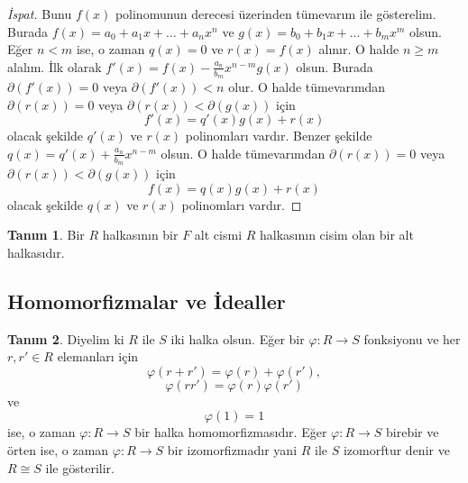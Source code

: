 \documentclass{article}
\theoremstyle{definition}
\newtheorem{defn}{Tanım}[section]
\theoremstyle{remark}
\begin{document}
    		\begin{proof}[İspat]
    		    Bunu $f(x)$ polinomunun derecesi üzerinden tümevarım ile gösterelim. Burada $f(x) = a_0 + a_1x + \dots + a_nx^n$ ve $g(x) = b_0 + b_1x + \dots + b_mx^m$ olsun. Eğer $n < m$ ise, o zaman $q(x) = 0$ ve $r(x) = f(x)$ alınır. O halde $n \geq m$ alalım. İlk olarak $f'(x) = f(x) - \frac{a_n}{b_m} x^{n - m} g(x)$ olsun. Burada $\partial(f'(x)) = 0$ veya $\partial(f'(x)) < n$ olur. O halde tümevarımdan $\partial(r(x)) = 0$ veya $\partial(r(x)) < \partial(g(x))$ için
    		    \begin{equation*}
    		        f'(x) = q'(x)g(x) + r(x)
    		    \end{equation*}
    		    olacak şekilde $q'(x)$ ve $r(x)$ polinomları vardır. Benzer şekilde $q(x) = q'(x) + \frac{a_n}{b_m}x^{n - m}$ olsun. O halde tümevarımdan $\partial(r(x)) = 0$ veya $\partial(r(x)) < \partial(g(x))$ için
    		    \begin{equation*}
    		        f(x) = q(x)g(x) + r(x)
    		    \end{equation*}
    		    olacak şekilde $q(x)$ ve $r(x)$ polinomları vardır.
    		\end{proof}
        	
        	\begin{defn}
        	    Bir $R$ halkasının bir $F$ alt cismi $R$ halkasının cisim olan bir alt halkasıdır.
        	\end{defn}
        	
        \subsection{Homomorfizmalar ve İdealler}
        	
        	\begin{defn}
        	    Diyelim ki $R$ ile $S$ iki halka olsun. Eğer bir $\varphi: R \to S$ fonksiyonu ve her $r, r' \in R$ elemanları için
        	    \begin{equation*}
    				\varphi(r + r') = \varphi(r) + \varphi(r'),
    			\end{equation*}
    			\begin{equation*}
    				\varphi(rr') = \varphi(r)\varphi(r')
    			\end{equation*}
    			ve
    			\begin{equation*}
    				\varphi(1) = 1
    			\end{equation*}
        	    ise, o zaman $\varphi: R \to S$ bir halka homomorfizmasıdır. Eğer $\varphi: R \to S$ birebir ve örten ise, o zaman $\varphi: R \to S$ bir izomorfizmadır yani $R$ ile $S$ izomorftur denir ve $R \cong S$ ile gösterilir.
    		\end{defn}
    		
\end{document}
